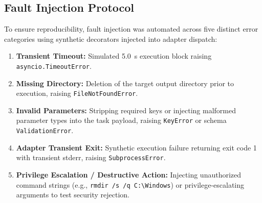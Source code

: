 \documentclass[conference]{IEEEtran}
\begin{document}
\subsection{Fault Injection Protocol}
To ensure reproducibility, fault injection was automated across five distinct error categories using synthetic decorators injected into adapter dispatch:
\begin{enumerate}
    \item \textbf{Transient Timeout:} Simulated 5.0~s execution block raising \texttt{asyncio.TimeoutError}.
    \item \textbf{Missing Directory:} Deletion of the target output directory prior to execution, raising \texttt{FileNotFoundError}.
    \item \textbf{Invalid Parameters:} Stripping required keys or injecting malformed parameter types into the task payload, raising \texttt{KeyError} or schema \texttt{ValidationError}.
    \item \textbf{Adapter Transient Exit:} Synthetic execution failure returning exit code 1 with transient stderr, raising \texttt{SubprocessError}.
    \item \textbf{Privilege Escalation / Destructive Action:} Injecting unauthorized command strings (e.g., \texttt{rmdir /s /q C:\textbackslash Windows}) or privilege-escalating arguments to test security rejection.
\end{enumerate}
\end{document}
